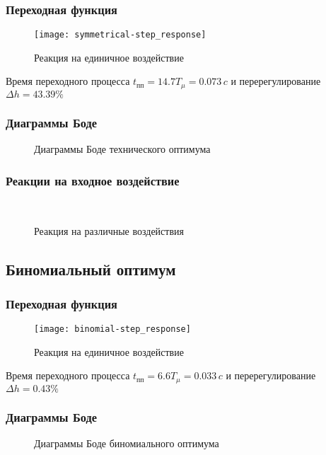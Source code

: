 			\subsubsection{Переходная функция}
				\begin{figure}[H]
					\centering
					\texttt{[image: symmetrical-step\_response]}
					\caption{Реакция на единичное воздействие}
				\end{figure}
				Время переходного процесса $t_{\text{пп}}=14.7T_{\mu}=0.073\,c$ и перерегулирование $\Delta h=43.39\%$
			\subsubsection{Диаграммы Боде}
				\begin{figure}[H]
					\centering
					\caption{Диаграммы Боде технического оптимума}
				\end{figure}
			\subsubsection{Реакции на входное воздействие}
				\begin{figure}[H]
					\centering
					\\
					\centering{}
					\caption{Реакция на различные воздействия}
				\end{figure}
		\subsection{Биномиальный оптимум}
			\subsubsection{Переходная функция}
				\begin{figure}[H]
					\centering
					\texttt{[image: binomial-step\_response]}
					\caption{Реакция на единичное воздействие}
				\end{figure}
				Время переходного процесса $t_{\text{пп}}=6.6T_{\mu}=0.033\,c$ и перерегулирование $\Delta h=0.43\%$
			\subsubsection{Диаграммы Боде}
				\begin{figure}[H]
					\centering
					\caption{Диаграммы Боде биномиального оптимума}
				\end{figure}
